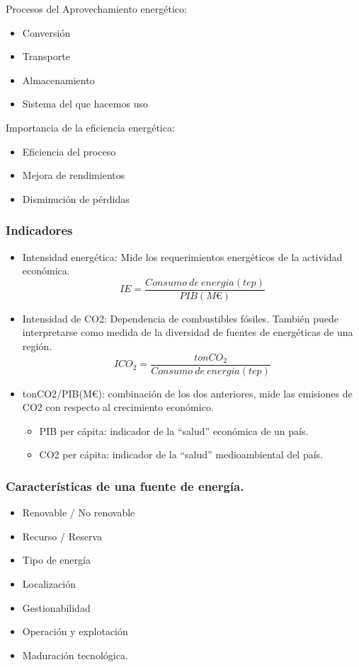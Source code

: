 Procesos del Aprovechamiento energético:
\begin{itemize}
    \item Conversión
    \item Transporte
    \item Almacenamiento
    \item Sistema del que hacemos uso
\end{itemize}

Importancia de la eficiencia energética:
\begin{itemize}
    \item Eficiencia del proceso
    \item Mejora de rendimientos
    \item Disminución de pérdidas
\end{itemize}

\subsubsection{Indicadores}

\begin{itemize}
    \item Intensidad energética: Mide los requerimientos energéticos de la actividad económica.
    \begin{equation}
        IE = \frac{Consumo\ de\ energia(tep)}{PIB(M€)}
    \end{equation}
    \item Intensidad de CO2: Dependencia de combustibles fósiles. También puede interpretarse como medida de la diversidad de fuentes de energéticas de una región.
    \begin{equation}
        ICO_2 = \frac{ton CO_2}{Consumo\ de\ energia(tep)}
    \end{equation}
    \item tonCO2/PIB(M€): combinación de los dos anteriores, mide las emisiones de CO2 con respecto al crecimiento económico.
    \begin{itemize}
        \item PIB per cápita: indicador de la ``salud'' económica de un país.
        \item CO2 per cápita: indicador de la ``salud'' medioambiental del país.
    \end{itemize}
\end{itemize}

\subsubsection{Características de una fuente de energía.}
\begin{itemize}
    \item Renovable / No renovable
    \item Recurso / Reserva
    \item Tipo de energía
    \item Localización
    \item Gestionabilidad
    \item Operación y explotación
    \item Maduración tecnológica.
\end{itemize}

